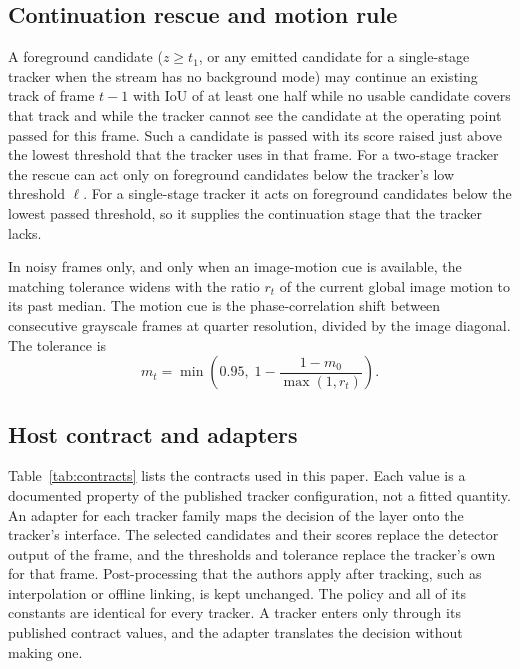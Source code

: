 \subsection{Continuation rescue and motion rule}\label{sec:rescue}
A foreground candidate ($z\ge t_1$, or any emitted candidate for a
single-stage tracker when the stream has no background mode) may continue an
existing track of frame $t-1$ with IoU of at least one half while no usable candidate covers that
track and while the tracker cannot see the candidate at the operating point
passed for this frame. Such a candidate is passed with its score raised just
above the lowest threshold that the tracker uses in that frame. For a
two-stage tracker the rescue can act only on foreground candidates below the
tracker's low threshold $\ell$. For a single-stage tracker it acts on
foreground candidates below the lowest passed threshold, so it supplies the
continuation stage that the tracker lacks.

In noisy frames only, and only when an image-motion cue is available, the
matching tolerance widens with the ratio $r_t$ of the current global image
motion to its past median. The motion cue is the phase-correlation shift
\cite{reddy1996phasecorr} between consecutive grayscale frames at quarter
resolution, divided by the image diagonal. The tolerance is
\begin{equation}
m_t=\min\!\left(0.95,\;1-\frac{1-m_0}{\max(1,r_t)}\right).
\label{eq:motion}
\end{equation}

\subsection{Host contract and adapters}\label{sec:contract}
Table~\ref{tab:contracts} lists the contracts used in this paper. Each value
is a documented property of the published tracker configuration, not a fitted
quantity. An adapter for each tracker family maps the decision of the layer
onto the tracker's interface. The selected candidates and their scores replace
the detector output of the frame, and the thresholds and tolerance replace the
tracker's own for that frame. Post-processing that the authors apply after tracking, such as interpolation
or offline linking, is kept unchanged. The policy and all of its constants are
identical for every tracker. A tracker enters only through its published
contract values, and the adapter translates the decision without making one.



